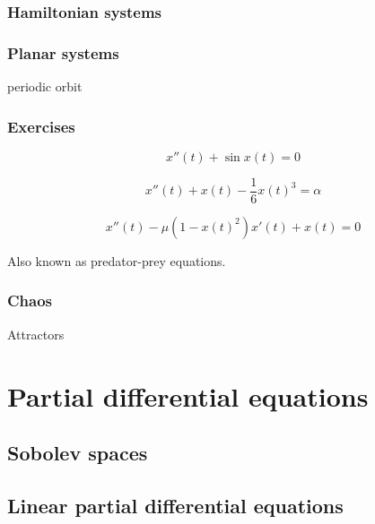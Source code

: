 \documentclass{../../large}
\begin{document}
\section{Hamiltonian systems}

\section{Planar systems}
periodic orbit


\begin{prb}
\end{prb}

\section*{Exercises}
\begin{prb}
\[x''(t)+\sin x(t)=0\]
\end{prb}
\begin{prb}
\[x''(t)+x(t)-\frac16x(t)^3=\alpha\]
\end{prb}

\begin{prb}
\[x''(t)-\mu(1-x(t)^2)x'(t)+x(t)=0\]
\end{prb}

\begin{prb}
Also known as predator-prey equations.
\end{prb}


\section{Chaos}
Attractors







\part{Partial differential equations}


\chapter{Sobolev spaces}

\chapter{Linear partial differential equations}
\end{document}
